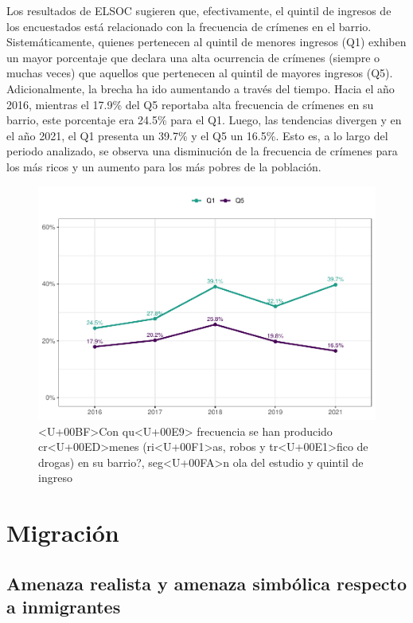 \documentclass[
  12pt,
]{book}
\begin{document}
Los resultados de ELSOC sugieren que, efectivamente, el quintil de ingresos de los encuestados está relacionado con la frecuencia de crímenes en el barrio. Sistemáticamente, quienes pertenecen al quintil de menores ingresos (Q1) exhiben un mayor porcentaje que declara una alta ocurrencia de crímenes (siempre o muchas veces) que aquellos que pertenecen al quintil de mayores ingresos (Q5). Adicionalmente, la brecha ha ido aumentando a través del tiempo. Hacia el año 2016, mientras el 17.9\% del Q5 reportaba alta frecuencia de crímenes en su barrio, este porcentaje era 24.5\% para el Q1. Luego, las tendencias divergen y en el año 2021, el Q1 presenta un 39.7\% y el Q5 un 16.5\%. Esto es, a lo largo del periodo analizado, se observa una disminución de la frecuencia de crímenes para los más ricos y un aumento para los más pobres de la población.

\begin{figure}

{\centering \includegraphics{reporte-elsoc_files/figure-latex/crim-quintil-1} 

}

\caption{<U+00BF>Con qu<U+00E9> frecuencia se han producido cr<U+00ED>menes (ri<U+00F1>as, robos y tr<U+00E1>fico de drogas) en su barrio?, seg<U+00FA>n ola del estudio y quintil de ingreso}\label{fig:crim-quintil}
\end{figure}

\hypertarget{migraciuxf3n}{%
\section{Migración}\label{migraciuxf3n}}

\hypertarget{amenaza-realista-y-amenaza-simbuxf3lica-respecto-a-inmigrantes}{%
\subsection*{Amenaza realista y amenaza simbólica respecto a inmigrantes}\label{amenaza-realista-y-amenaza-simbuxf3lica-respecto-a-inmigrantes}}
\end{document}
